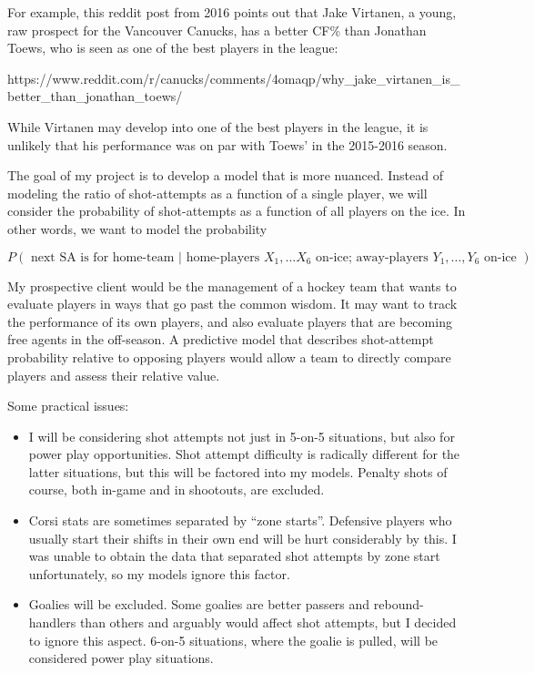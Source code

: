 \documentclass[11pt]{article}
\providecommand{\tightlist}{%
      \setlength{\itemsep}{0pt}\setlength{\parskip}{0pt}}
\begin{document}
For example, this reddit post from 2016 points out that Jake Virtanen, a
young, raw prospect for the Vancouver Canucks, has a better CF\% than
Jonathan Toews, who is seen as one of the best players in the league:

https://www.reddit.com/r/canucks/comments/4omaqp/why\_jake\_virtanen\_is\_better\_than\_jonathan\_toews/

While Virtanen may develop into one of the best players in the league,
it is unlikely that his performance was on par with Toews' in the
2015-2016 season.

The goal of my project is to develop a model that is more nuanced.
Instead of modeling the ratio of shot-attempts as a function of a single
player, we will consider the probability of shot-attempts as a function
of all players on the ice. In other words, we want to model the
probability

\[P(\textrm{ next SA is for home-team } | \textrm{ home-players } X_1, … X_6 \textrm{ on-ice; away-players } Y_1, …, Y_6 \textrm{ on-ice } )\]

My prospective client would be the management of a hockey team that
wants to evaluate players in ways that go past the common wisdom. It may
want to track the performance of its own players, and also evaluate
players that are becoming free agents in the off-season. A predictive
model that describes shot-attempt probability relative to opposing
players would allow a team to directly compare players and assess their
relative value.

Some practical issues:

\begin{itemize}
\tightlist
\item
  I will be considering shot attempts not just in 5-on-5 situations, but
  also for power play opportunities. Shot attempt difficulty is
  radically different for the latter situations, but this will be
  factored into my models. Penalty shots of course, both in-game and in
  shootouts, are excluded.
\item
  Corsi stats are sometimes separated by ``zone starts''. Defensive
  players who usually start their shifts in their own end will be hurt
  considerably by this. I was unable to obtain the data that separated
  shot attempts by zone start unfortunately, so my models ignore this
  factor.
\item
  Goalies will be excluded. Some goalies are better passers and
  rebound-handlers than others and arguably would affect shot attempts,
  but I decided to ignore this aspect. 6-on-5 situations, where the
  goalie is pulled, will be considered power play situations.
\end{itemize}
\end{document}
